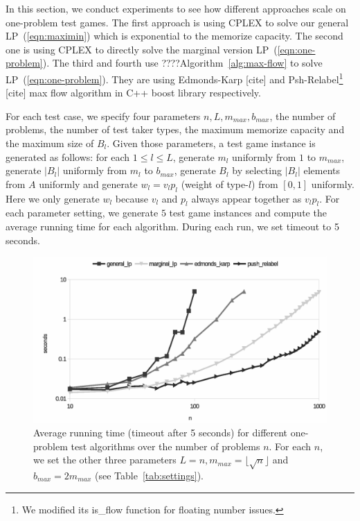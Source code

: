 \documentclass{article}
\begin{document}
In this section, we conduct experiments to see how different approaches scale
on one-problem test games. The first approach is using CPLEX to solve our
general LP~(\ref{eqn:maximin}) which is exponential to the memorize capacity.
The second one is using CPLEX to directly solve the marginal version
LP~(\ref{eqn:one-problem}).  The third and fourth use
????Algorithm~\ref{alg:max-flow} to solve LP~(\ref{eqn:one-problem}). They are
using Edmonds-Karp [cite] and Psh-Relabel\footnote{We modified its is\_flow
function for floating number issues.} [cite] max flow algorithm in C++ boost
library respectively.


For each test case, we specify four parameters $n, L, m_{max}, b_{max}$,
the number of problems, the number of test taker types, the maximum memorize
capacity and the maximum size of $B_l$. Given those parameters, a test game
instance is generated as follows: for each $1 \leq l \leq L$, generate $m_l$
uniformly from $1$ to $m_{max}$, generate $|B_l|$ uniformly from $m_l$ to
$b_{max}$, generate $B_l$ by selecting $|B_l|$ elements from $A$ uniformly and
generate $w_l = v_l p_l$ (weight of type-$l$) from $[0,1]$ uniformly. Here we
only generate $w_l$ because $v_l$ and $p_l$ always appear together as $v_l
p_l$. For each parameter setting, we generate $5$ test game instances and
compute the average running time for each algorithm. During each run, we set
timeout to 5 seconds. 

\begin{figure}
	\caption{Average running time (timeout after 5 seconds) for different
	one-problem test algorithms over the number of problems $n$. For each
	$n$, we set the other three parameters $L = n, m_{max} = \lfloor
	\sqrt{n} \rfloor$ and $b_{max} = 2m_{max}$ (see
	Table~\ref{tab:settings}).}
	\label{fig:benchmark}
	\includegraphics[trim=0 10mm 0 -5mm, clip, width=\linewidth]{benchmark_all}
\end{figure}
\end{document}
